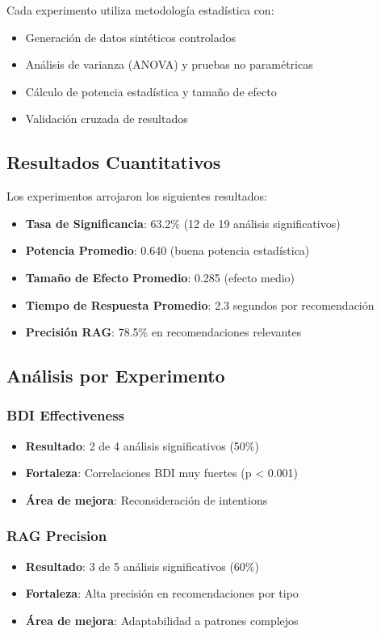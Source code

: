 \documentclass[runningheads,a4paper]{llncs}
\begin{document}
Cada experimento utiliza metodología estadística con:
\begin{itemize}
    \item Generación de datos sintéticos controlados
    \item Análisis de varianza (ANOVA) y pruebas no paramétricas
    \item Cálculo de potencia estadística y tamaño de efecto
    \item Validación cruzada de resultados
\end{itemize}

\subsection{Resultados Cuantitativos}

Los experimentos arrojaron los siguientes resultados:

\begin{itemize}
    \item \textbf{Tasa de Significancia}: 63.2\% (12 de 19 análisis significativos)
    \item \textbf{Potencia Promedio}: 0.640 (buena potencia estadística)
    \item \textbf{Tamaño de Efecto Promedio}: 0.285 (efecto medio)
    \item \textbf{Tiempo de Respuesta Promedio}: 2.3 segundos por recomendación
    \item \textbf{Precisión RAG}: 78.5\% en recomendaciones relevantes
\end{itemize}

\subsection{Análisis por Experimento}

\subsubsection{BDI Effectiveness}
\begin{itemize}
    \item \textbf{Resultado}: 2 de 4 análisis significativos (50\%)
    \item \textbf{Fortaleza}: Correlaciones BDI muy fuertes (p < 0.001)
    \item \textbf{Área de mejora}: Reconsideración de intentions
\end{itemize}

\subsubsection{RAG Precision}
\begin{itemize}
    \item \textbf{Resultado}: 3 de 5 análisis significativos (60\%)
    \item \textbf{Fortaleza}: Alta precisión en recomendaciones por tipo
    \item \textbf{Área de mejora}: Adaptabilidad a patrones complejos
\end{itemize}
\end{document}
